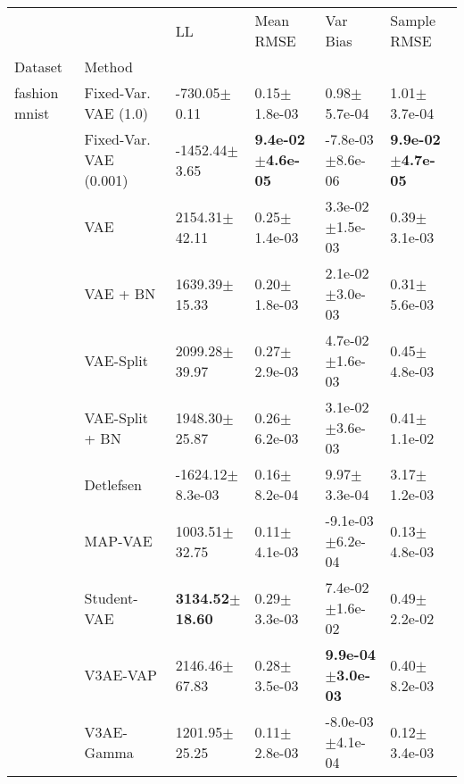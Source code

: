 \begin{tabular}{llllll}
\toprule
             &     &                           LL &                     Mean RMSE &                       Var Bias &                   Sample RMSE \\
Dataset & Method &                              &                               &                                &                               \\
\midrule
fashion mnist & Fixed-Var. VAE (1.0) &             -730.05$\pm$0.11 &              0.15$\pm$1.8e-03 &               0.98$\pm$5.7e-04 &              1.01$\pm$3.7e-04 \\
             & Fixed-Var. VAE (0.001) &            -1452.44$\pm$3.65 &  \textbf{9.4e-02$\pm$4.6e-05} &           -7.8e-03$\pm$8.6e-06 &  \textbf{9.9e-02$\pm$4.7e-05} \\
             & VAE &            2154.31$\pm$42.11 &              0.25$\pm$1.4e-03 &            3.3e-02$\pm$1.5e-03 &              0.39$\pm$3.1e-03 \\
             & VAE + BN &            1639.39$\pm$15.33 &              0.20$\pm$1.8e-03 &            2.1e-02$\pm$3.0e-03 &              0.31$\pm$5.6e-03 \\
             & VAE-Split &            2099.28$\pm$39.97 &              0.27$\pm$2.9e-03 &            4.7e-02$\pm$1.6e-03 &              0.45$\pm$4.8e-03 \\
             & VAE-Split + BN &            1948.30$\pm$25.87 &              0.26$\pm$6.2e-03 &            3.1e-02$\pm$3.6e-03 &              0.41$\pm$1.1e-02 \\
             & Detlefsen &         -1624.12$\pm$8.3e-03 &              0.16$\pm$8.2e-04 &               9.97$\pm$3.3e-04 &              3.17$\pm$1.2e-03 \\
             & MAP-VAE &            1003.51$\pm$32.75 &              0.11$\pm$4.1e-03 &           -9.1e-03$\pm$6.2e-04 &              0.13$\pm$4.8e-03 \\
             & Student-VAE &   \textbf{3134.52$\pm$18.60} &              0.29$\pm$3.3e-03 &            7.4e-02$\pm$1.6e-02 &              0.49$\pm$2.2e-02 \\
             & V3AE-VAP &            2146.46$\pm$67.83 &              0.28$\pm$3.5e-03 &   \textbf{9.9e-04$\pm$3.0e-03} &              0.40$\pm$8.2e-03 \\
             & V3AE-Gamma &            1201.95$\pm$25.25 &              0.11$\pm$2.8e-03 &           -8.0e-03$\pm$4.1e-04 &              0.12$\pm$3.4e-03 \\

\end{tabular}

